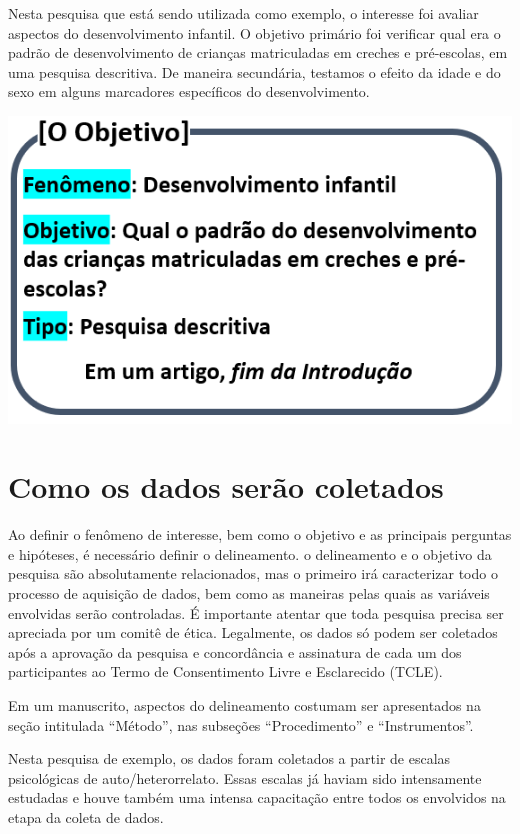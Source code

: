 \documentclass[
]{book}
\begin{document}
Nesta pesquisa que está sendo utilizada como exemplo, o interesse foi avaliar aspectos do desenvolvimento infantil. O objetivo primário foi verificar qual era o padrão de desenvolvimento de crianças matriculadas em creches e pré-escolas, em uma pesquisa descritiva. De maneira secundária, testamos o efeito da idade e do sexo em alguns marcadores específicos do desenvolvimento.

\includegraphics{./img/cap_pesquisa_aplicada_oque.png}

\hypertarget{como-os-dados-seruxe3o-coletados}{%
\section{Como os dados serão coletados}\label{como-os-dados-seruxe3o-coletados}}

Ao definir o fenômeno de interesse, bem como o objetivo e as principais perguntas e hipóteses, é necessário definir o delineamento. o delineamento e o objetivo da pesquisa são absolutamente relacionados, mas o primeiro irá caracterizar todo o processo de aquisição de dados, bem como as maneiras pelas quais as variáveis envolvidas serão controladas. É importante atentar que toda pesquisa precisa ser apreciada por um comitê de ética. Legalmente, os dados só podem ser coletados após a aprovação da pesquisa e concordância e assinatura de cada um dos participantes ao Termo de Consentimento Livre e Esclarecido (TCLE).

Em um manuscrito, aspectos do delineamento costumam ser apresentados na seção intitulada ``Método'', nas subseções ``Procedimento'' e ``Instrumentos''.

Nesta pesquisa de exemplo, os dados foram coletados a partir de escalas psicológicas de auto/heterorrelato. Essas escalas já haviam sido intensamente estudadas e houve também uma intensa capacitação entre todos os envolvidos na etapa da coleta de dados.
\end{document}
